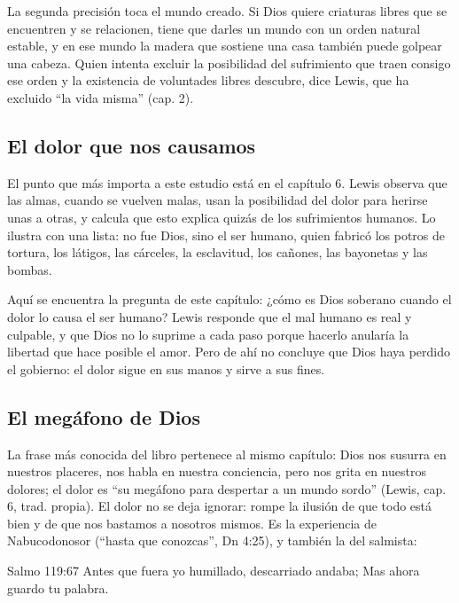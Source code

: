 La segunda precisión toca el mundo creado. Si Dios quiere criaturas libres que se encuentren y se relacionen, tiene que darles un mundo con un orden natural estable, y en ese mundo la madera que sostiene una casa también puede golpear una cabeza. Quien intenta excluir la posibilidad del sufrimiento que traen consigo ese orden y la existencia de voluntades libres descubre, dice Lewis, que ha excluido ``la vida misma'' (cap. 2).

\subsection{El dolor que nos causamos}
El punto que más importa a este estudio está en el capítulo 6. Lewis observa que las almas, cuando se vuelven malas, usan la posibilidad del dolor para herirse unas a otras, y calcula que esto explica quizás  de los sufrimientos humanos. Lo ilustra con una lista: no fue Dios, sino el ser humano, quien fabricó los potros de tortura, los látigos, las cárceles, la esclavitud, los cañones, las bayonetas y las bombas.


Aquí se encuentra la pregunta de este capítulo: ¿cómo es Dios soberano cuando el dolor lo causa el ser humano? Lewis responde que el mal humano es real y culpable, y que Dios no lo suprime a cada paso porque hacerlo anularía la libertad que hace posible el amor. Pero de ahí no concluye que Dios haya perdido el gobierno: el dolor sigue en sus manos y sirve a sus fines.

\subsection{El megáfono de Dios}
La frase más conocida del libro pertenece al mismo capítulo: Dios nos susurra en nuestros placeres, nos habla en nuestra conciencia, pero nos grita en nuestros dolores; el dolor es ``su megáfono para despertar a un mundo sordo'' (Lewis, cap. 6, trad. propia). El dolor no se deja ignorar: rompe la ilusión de que todo está bien y de que nos bastamos a nosotros mismos. Es la experiencia de Nabucodonosor (``hasta que conozcas'', Dn 4:25), y también la del salmista:

\begin{verso}{Salmo 119:67}
Antes que fuera yo humillado, descarriado andaba; Mas ahora guardo tu palabra.
\end{verso}

